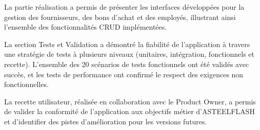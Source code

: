 La partie réalisation a permis de présenter les interfaces développées pour la gestion des fournisseurs, des bons d'achat et des employés, illustrant ainsi l'ensemble des fonctionnalités CRUD implémentées.

La section Tests et Validation a démontré la fiabilité de l'application à travers une stratégie de tests à plusieurs niveaux (unitaires, intégration, fonctionnels et recette). L'ensemble des 20 scénarios de tests fonctionnels ont été validés avec succès, et les tests de performance ont confirmé le respect des exigences non fonctionnelles.

La recette utilisateur, réalisée en collaboration avec le Product Owner, a permis de valider la conformité de l'application aux objectifs métier d'ASTEELFLASH et d'identifier des pistes d'amélioration pour les versions futures.

